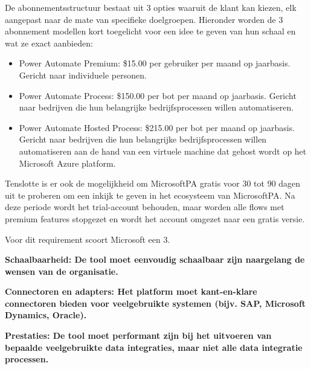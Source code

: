 \vspace{\baselineskip}

De abonnementsstructuur bestaat uit 3 opties waaruit de klant kan kiezen, elk aangepast naar de mate van specifieke doelgroepen. Hieronder worden de 3 abonnement modellen kort toegelicht voor een idee te geven van hun schaal en wat ze exact aanbieden:

\begin{itemize}
    \item Power Automate Premium: \$15.00 per gebruiker per maand op jaarbasis. Gericht naar individuele personen.
    \item Power Automate Process: \$150.00 per bot per maand op jaarbasis. Gericht naar bedrijven die hun belangrijke bedrijfsprocessen willen automatiseren.
    \item Power Automate Hosted Process: \$215.00 per bot per maand op jaarbasis. Gericht naar bedrijven die hun belangrijke bedrijfsprocessen willen automatiseren aan de hand van een virtuele machine dat gehost wordt op het Microsoft Azure platform.
\end{itemize}

Tenslotte is er ook de mogelijkheid om MicrosoftPA gratis voor 30 tot 90 dagen uit te proberen om een inkijk te geven in het ecosysteem van MicrosoftPA. Na deze periode wordt het trial-account behouden, maar worden alle flows met premium features stopgezet en wordt het account omgezet naar een gratis versie.

Voor dit requirement scoort Microsoft een 3.

\vspace{\baselineskip}

\textbf{Schaalbaarheid: De tool moet eenvoudig schaalbaar zijn naargelang de wensen van de organisatie.}

\vspace{\baselineskip}



\vspace{\baselineskip}

\textbf{Connectoren en adapters: Het platform moet kant-en-klare connectoren bieden voor veelgebruikte systemen (bijv. SAP, Microsoft Dynamics, Oracle).}
\vspace{\baselineskip}



\vspace{\baselineskip}

\textbf{Prestaties: De tool moet performant zijn bij het uitvoeren van bepaalde veelgebruikte data integraties, maar niet alle data integratie processen.}

